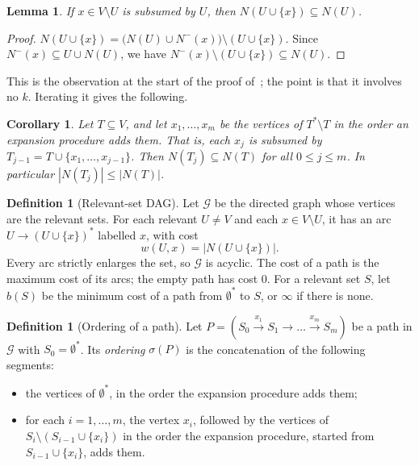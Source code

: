 \documentclass[11pt]{article}
\newtheorem{lemma}[theorem]{Lemma}
\newtheorem{corollary}[theorem]{Corollary}
\theoremstyle{definition}
\newtheorem{definition}[theorem]{Definition}
\newcommand{\Nm}{N^{-}}
\newcommand{\Gr}{\mathcal{G}}
\newcommand{\cost}{w}
\newcommand{\bott}{b}
\newcommand{\set}[1]{\{#1\}}
\begin{document}
\begin{lemma}\label{lem:mono}
If $x\in V\setminus U$ is subsumed by $U$, then $N(U\cup\set x)\subseteq N(U)$.
\end{lemma}
\begin{proof}
$N(U\cup\set x)=\bigl(N(U)\cup \Nm(x)\bigr)\setminus(U\cup\set x)$. Since
$\Nm(x)\subseteq U\cup N(U)$, we have
$\Nm(x)\setminus(U\cup\set x)\subseteq N(U)$.
\end{proof}

This is the observation at the start of the proof of~\cite[Lemma~1]{Kob15};
the point is that it involves no $k$. Iterating it gives the following.

\begin{corollary}\label{cor:exp}
Let $T\subseteq V$, and let $x_1,\dots,x_m$ be the vertices of
$T^*\setminus T$ in the order an expansion procedure adds them. That is,
each $x_j$ is subsumed by $T_{j-1}=T\cup\set{x_1,\dots,x_{j-1}}$. Then
$N(T_j)\subseteq N(T)$ for all $0\le j\le m$. In particular
$|N(T_j)|\le|N(T)|$.
\end{corollary}

\begin{definition}[Relevant-set DAG]
Let $\Gr$ be the directed graph whose vertices are the relevant sets. For
each relevant $U\ne V$ and each $x\in V\setminus U$, it has an arc
$U\to(U\cup\set x)^*$ labelled $x$, with cost
\[\cost(U,x)=|N(U\cup\set x)|.\]
Every arc strictly enlarges the set, so $\Gr$ is acyclic. The cost of a path
is the maximum cost of its arcs; the empty path has cost $0$. For a relevant
set $S$, let $\bott(S)$ be the minimum cost of a path from $\emptyset^*$ to
$S$, or $\infty$ if there is none.
\end{definition}

\begin{definition}[Ordering of a path]\label{def:pathorder}
Let $P=(S_0\xrightarrow{x_1}S_1\to\dots\xrightarrow{x_m}S_m)$ be a path in
$\Gr$ with $S_0=\emptyset^*$. Its \emph{ordering} $\sigma(P)$ is the
concatenation of the following segments:
\begin{itemize}
\item the vertices of $\emptyset^*$, in the order the expansion procedure
adds them;
\item for each $i=1,\dots,m$, the vertex $x_i$, followed by the vertices of
$S_i\setminus(S_{i-1}\cup\set{x_i})$ in the order the expansion procedure,
started from $S_{i-1}\cup\set{x_i}$, adds them.
\end{itemize}
\end{definition}
\end{document}

